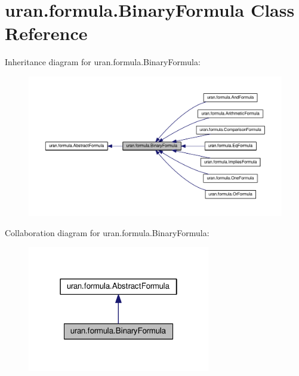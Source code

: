 \hypertarget{classuran_1_1formula_1_1_binary_formula}{}\section{uran.\+formula.\+Binary\+Formula Class Reference}
\label{classuran_1_1formula_1_1_binary_formula}


Inheritance diagram for uran.\+formula.\+Binary\+Formula\+:
\nopagebreak
\begin{figure}[H]
\begin{center}
\leavevmode
\includegraphics[width=350pt]{classuran_1_1formula_1_1_binary_formula__inherit__graph}
\end{center}
\end{figure}


Collaboration diagram for uran.\+formula.\+Binary\+Formula\+:
\nopagebreak
\begin{figure}[H]
\begin{center}
\leavevmode
\includegraphics[width=226pt]{classuran_1_1formula_1_1_binary_formula__coll__graph}
\end{center}
\end{figure}
